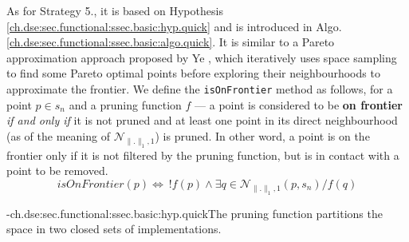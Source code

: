         As for Strategy 5., it is based on Hypothesis \ref{ch.dse:sec.functional:ssec.basic:hyp.quick} and is introduced in Algo. \ref{ch.dse:sec.functional:ssec.basic:algo.quick}.
        It is similar to a Pareto approximation approach proposed by Ye \etal{} \cite{ye_scalehls_2021}, which iteratively uses space sampling to find some Pareto optimal points before exploring their neighbourhoods to approximate the frontier.
        We define the {\tt isOnFrontier} method as follows, for a point $p \in s_n$ and a pruning function $f$ --- a point is considered to be {\bf on frontier} {\it if and only if} it is not pruned and at least one point in its direct neighbourhood (as of the meaning of $\mathcal{N}_{\|.\|_1, 1}$) is pruned.
        In other word, a point is on the frontier only if it is not filtered by the pruning function, but is in contact with a point to be removed.
        \begin{equation}
            isOnFrontier(p) \Leftrightarrow~!f(p) \land \exists q \in \mathcal{N}_{\|.\|_1, 1}(p, s_n) / f(q)
        \end{equation}

        \hyp{ch.dse:sec.functional:ssec.basic:hyp.quick}{The pruning function partitions the space in two closed sets of implementations.}

